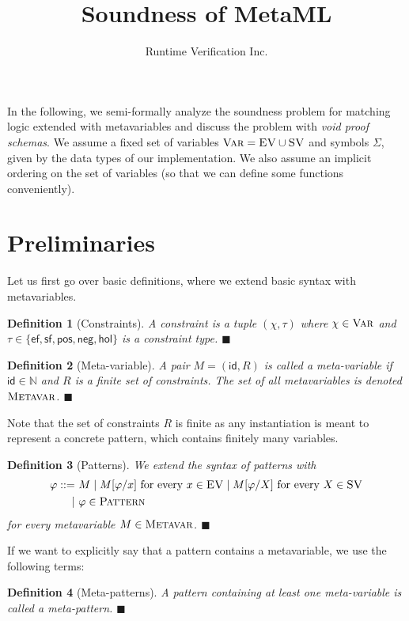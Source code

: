 \documentclass{article}
\title{Soundness of MetaML}
\author{Runtime Verification Inc.}
\newcommand{\xqed}[1]{%
    \leavevmode\unskip\penalty9999 \hbox{}\nobreak\hfill
    \quad\hbox{\ensuremath{#1}}}
\newcommand{\xqedhere}{\xqed{\blacksquare}}
\newtheorem{deff}{Definition}
\newenvironment{definition}[1]{%
  \begin{deff}#1}{%
  \xqedhere\end{deff}%
}
\numberwithin{deff}{section}
\numberwithin{lemma*}{section}
\newcommand{\Nat}{\mathbb{N}}
\newcommand{\Pat}{\textsc{Pattern}}
\newcommand{\Var}{\textsc{Var}}
\newcommand{\EVar}{\textsc{EV}}
\newcommand{\SVar}{\textsc{SV}}
\newcommand{\s}[1]{\{ #1 \}}
\newcommand{\Metavar}{\textsc{Metavar}}
\newcommand{\Ef}{\mathsf{ef}}
\newcommand{\Sf}{\mathsf{sf}}
\newcommand{\Pos}{\mathsf{pos}}
\newcommand{\Neg}{\mathsf{neg}}
\newcommand{\Hol}{\mathsf{hol}}
\begin{document}
\maketitle

In the following, we semi-formally analyze the soundness problem for matching logic extended with metavariables and discuss the problem with \emph{void proof schemas}.
We assume a fixed set of variables $\Var = \EVar \cup \SVar$ and symbols $\Sigma$, given by the data types of our implementation.
We also assume an implicit ordering on the set of variables (so that we can define some functions conveniently).

\section{Preliminaries}

Let us first go over basic definitions, where we extend basic syntax with metavariables.

\begin{definition}[Constraints]
  A constraint is a tuple $(\chi, \tau)$ where $\chi \in \Var$ and $\tau \in \s{\Ef, \Sf, \Pos, \Neg, \Hol}$ is a \emph{constraint type}.
\end{definition}

\begin{definition}[Meta-variable]
  A pair $M = (\mathsf{id}, R)$ is called a \emph{meta-variable} if $\mathsf{id} \in \Nat$ and $R$ is a finite set of constraints.
  The set of all metavariables is denoted $\Metavar$.
\end{definition}

Note that the set of constraints $R$ is finite as any instantiation is meant to represent a concrete pattern, which contains finitely many variables.

\begin{definition}[Patterns]
  We extend the syntax of patterns with
  \begin{align*}
    \varphi ::= &\ M \mid M[\varphi/x] \text{ for every }x \in \EVar \mid M[\varphi/ X]\text{ for every }X \in \SVar \\
    \mid &\ \varphi \in \Pat
  \end{align*}
  for every metavariable $M \in \Metavar$.
\end{definition}

If we want to explicitly say that a pattern contains a metavariable, we use the following terms:
\begin{definition}[Meta-patterns]
  A pattern containing at least one meta-variable is called a \emph{meta-pattern}.
\end{definition}
\end{document}
